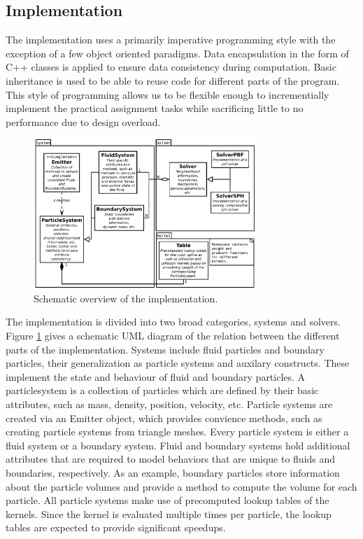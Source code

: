 \documentclass[11pt, letterpaper, twocolumn]{article}
\begin{document}


\subsection{Implementation}
The implementation uses a primarily imperative programming style with the exception of a few object oriented paradigms. Data encapsulation in the form of C++ classes is applied to ensure data consistency during computation. Basic inheritance is used to be able to reuse code for different parts of the program. This style of programming allows us to be flexible enough to incrementially implement the practical assignment tasks while sacrificing little to no performance due to design overload.
\begin{figure}[ht]
    \centering
    \includegraphics[width=0.75\textwidth]{images/system.pdf}
    \caption{Schematic overview of the implementation.}
    \label{fig:systemuml}
\end{figure}

The implementation is divided into two broad categories, systems and solvers. Figure \ref{fig:systemuml} gives a schematic UML diagram of the relation between the different parts of the implementation.
Systems include fluid particles and boundary particles, their generalization as particle systems and auxilary constructs. These implement the state and behaviour of fluid and boundary particles. A particlesystem is a collection of particles which are defined by their basic attributes, such as mass, density, position, velocity, etc. Particle systems are created via an Emitter object, which provides convience methods, such as creating particle systems from triangle meshes.
Every particle system is either a fluid system or a boundary system. Fluid and boundary systems hold additional attributes that are required to model behaviors that are unique to fluids and boundaries, respectively. As an example, boundary particles store information about the particle volumes and provide a method to compute the volume for each particle. All particle systems make use of precomputed lookup tables of the kernels. Since the kernel is evaluated multiple times per particle, the lookup tables are expected to provide significant speedups.
\end{document}
